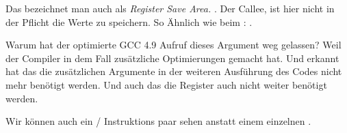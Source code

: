 Das bezeichnet man auch als \emph{Register Save Area.} \ARMPCS.
Der Callee, ist hier nicht in der Pflicht die Werte zu speichern.
So Ähnlich wie beim : .


Warum hat der optimierte GCC 4.9 Aufruf dieses Argument weg gelassen?
Weil der Compiler in dem Fall zusätzliche Optimierungen gemacht hat. Und
erkannt hat das die zusätzlichen Argumente in der weiteren Ausführung des 
Codes nicht mehr benötigt werden. Und auch das die Register  auch 
nicht weiter benötigt werden.


Wir können auch ein / Instruktions paar sehen anstatt einem einzelnen
.

